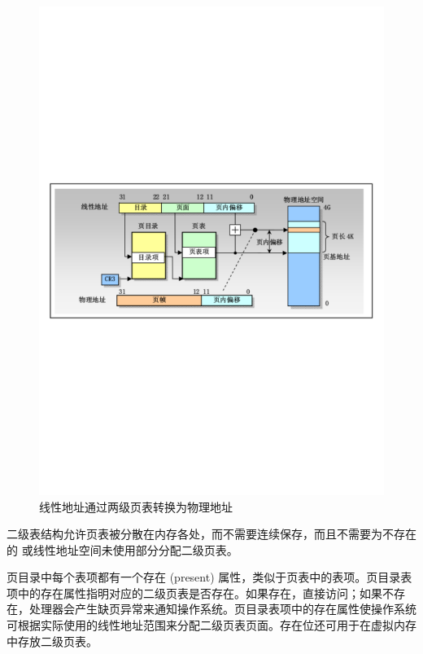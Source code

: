 \begin{figure}[htbp]
    \centering
    \includegraphics[width=\textwidth]{img/线性地址通过两级页表转换为物理地址.pdf}
    \caption{线性地址通过两级页表转换为物理地址}
    \label{fig:线性地址通过两级页表转换为物理地址}
\end{figure}

二级表结构允许页表被分散在内存各处，而不需要连续保存，而且不需要为不存在的 或线性地址空间未使用部分分配二级页表。

页目录中每个表项都有一个存在 (present) 属性，类似于页表中的表项。页目录表项中的存在属性指明对应的二级页表是否存在。如果存在，直接访问；如果不存在，处理器会产生缺页异常来通知操作系统。页目录表项中的存在属性使操作系统可根据实际使用的线性地址范围来分配二级页表页面。存在位还可用于在虚拟内存中存放二级页表。

